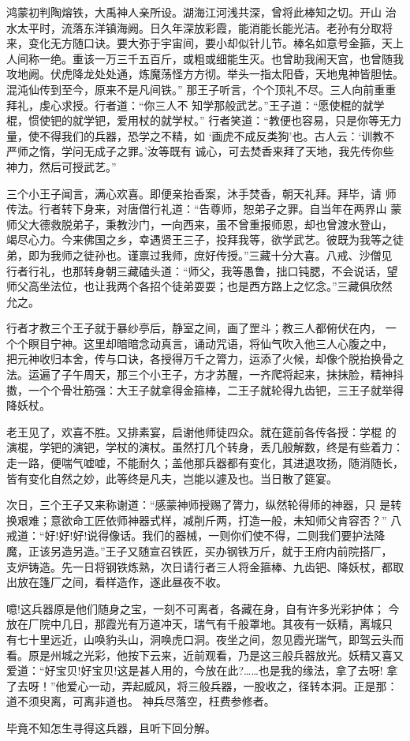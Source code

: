 鸿蒙初判陶熔铁，大禹神人亲所设。湖海江河浅共深，曾将此棒知之切。开山
治水太平时，流落东洋镇海阙。日久年深放彩霞，能消能长能光洁。老孙有分取将
来，变化无方随口诀。要大弥于宇宙间，要小却似针儿节。棒名如意号金箍，天上
人间称一绝。重该一万三千五百斤，或粗或细能生灭。也曾助我闹天宫，也曾随我
攻地阙。伏虎降龙处处通，炼魔荡怪方方彻。举头一指太阳昏，天地鬼神皆胆怯。
混沌仙传到至今，原来不是凡间铁。”
那王子听言，个个顶礼不尽。三人向前重重拜礼，虔心求授。行者道：“你三人不
知学那般武艺。”王子道：“愿使棍的就学棍，惯使钯的就学钯，爱用杖的就学杖。”
行者笑道：“教便也容易，只是你等无力量，使不得我们的兵器，恐学之不精，如
‘画虎不成反类狗’也。古人云：‘训教不严师之惰，学问无成子之罪。’汝等既有
诚心，可去焚香来拜了天地，我先传你些神力，然后可授武艺。”

三个小王子闻言，满心欢喜。即便亲抬香案，沐手焚香，朝天礼拜。拜毕，请
师传法。行者转下身来，对唐僧行礼道：“告尊师，恕弟子之罪。自当年在两界山
蒙师父大德救脱弟子，秉教沙门，一向西来，虽不曾重报师恩，却也曾渡水登山，
竭尽心力。今来佛国之乡，幸遇贤王三子，投拜我等，欲学武艺。彼既为我等之徒
弟，即为我师之徒孙也。谨禀过我师，庶好传授。”三藏十分大喜。八戒、沙僧见
行者行礼，也那转身朝三藏磕头道：“师父，我等愚鲁，拙口钝腮，不会说话，望
师父高坐法位，也让我两个各招个徒弟耍耍；也是西方路上之忆念。”三藏俱欣然
允之。

行者才教三个王子就于暴纱亭后，静室之间，画了罡斗；教三人都俯伏在内，
一个个瞑目宁神。这里却暗暗念动真言，诵动咒语，将仙气吹入他三人心腹之中，
把元神收归本舍，传与口诀，各授得万千之膂力，运添了火候，却像个脱抬换骨之
法。运遍了子午周天，那三个小王子，方才苏醒，一齐爬将起来，抹抹脸，精神抖
擞，一个个骨壮筋强：大王子就拿得金箍棒，二王子就轮得九齿钯，三王子就举得
降妖杖。

老王见了，欢喜不胜。又排素宴，启谢他师徒四众。就在筵前各传各授：学棍
的演棍，学钯的演钯，学杖的演杖。虽然打几个转身，丢几般解数，终是有些着力：
走一路，便喘气嘘嘘，不能耐久；盖他那兵器都有变化，其进退攻扬，随消随长，
皆有变化自然之妙，此等终是凡夫，岂能以遽及也。当日散了筵宴。

次日，三个王子又来称谢道：“感蒙神师授赐了膂力，纵然轮得师的神器，只
是转换艰难；意欲命工匠依师神器式样，减削斤两，打造一般，未知师父肯容否？”
八戒道：“好!好!好!说得像话。我们的器械，一则你们使不得，二则我们要护法降
魔，正该另造另造。”王子又随宣召铁匠，买办钢铁万斤，就于王府内前院搭厂，
支炉铸造。先一日将钢铁炼熟，次日请行者三人将金箍棒、九齿钯、降妖杖，都取
出放在篷厂之间，看样造作，遂此昼夜不收。

噫!这兵器原是他们随身之宝，一刻不可离者，各藏在身，自有许多光彩护体；
今放在厂院中几日，那霞光有万道冲天，瑞气有千般罩地。其夜有一妖精，离城只
有七十里远近，山唤豹头山，洞唤虎口洞。夜坐之间，忽见霞光瑞气，即驾云头而
看。原是州城之光彩，他按下云来，近前观看，乃是这三般兵器放光。妖精又喜又
爱道：“好宝贝!好宝贝!这是甚人用的，今放在此?……也是我的缘法，拿了去呀!
拿了去呀！”他爱心一动，弄起威风，将三般兵器，一股收之，径转本洞。正是那：
道不须臾离，可离非道也。
神兵尽落空，枉费参修者。

毕竟不知怎生寻得这兵器，且听下回分解。